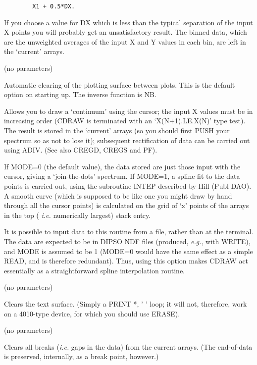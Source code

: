 \begin {description}
\begin{verbatim}
        X1 + 0.5*DX.
\end{verbatim}

If you choose a value for DX which is less than the typical separation
of the input X points you will probably get an unsatisfactory result.
The binned data, which are the unweighted averages of the input X and
Y values in each bin, are left in the `current' arrays.

\item [BOX] (no parameters)

Automatic clearing of the plotting surface between plots. This is the
default option on starting up. The inverse function is NB.

\item [CDRAW] [filename or mode]

Allows you to draw a `continuum' using the cursor; the input X values
must be in increasing order (CDRAW is terminated with an
`X(N+1).LE.X(N)' type test). The result is stored in the `current'
arrays (so you should first PUSH your spectrum so as not to lose it);
subsequent rectification of data can be carried out using ADIV. (See
also CREGD, CREGS and PF).

If MODE=0 (the default value), the data stored are just those input
with the cursor, giving a `join-the-dots' spectrum. If MODE=1, a
spline fit to the data points is carried out, using the subroutine
INTEP described by Hill (Publ DAO). A smooth curve (which is supposed
to be like one you might draw by hand through all the cursor points)
is calculated on the grid of `x' points of the arrays in the top ({\em
i.e.} numerically largest) stack entry.

It is possible to input data to this routine from a file, rather than
at the terminal. The data are expected to be in DIPSO NDF files
(produced, {\em e.g.}, with WRITE), and MODE is assumed to be 1
(MODE=0 would have the same effect as a simple READ, and is therefore
redundant). Thus, using this option makes CDRAW act essentially as a
straightforward spline interpolation routine.

\item [CLEAR] (no parameters)

Clears the text surface. (Simply a PRINT *, ' ' loop;  it will not,
therefore, work on a 4010-type device, for which you should use
ERASE).

\item [CLRBRK] (no parameters)

Clears all breaks ({\em i.e.} gaps in the data) from the current
arrays. (The end-of-data is preserved, internally, as a break point,
however.)


\end{description}
